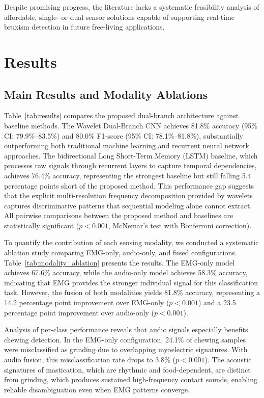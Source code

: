 \documentclass[pdflatex,sn-vancouver-num, iicol]{sn-jnl}
\begin{document}
Despite promising progress, the literature lacks a systematic feasibility analysis of affordable, single- or dual-sensor solutions capable of supporting real-time bruxism detection in future free-living applications.



\section{Results}
\subsection{Main Results and Modality Ablations}

Table~\ref{tab:results} compares the proposed dual-branch architecture against baseline methods. The Wavelet Dual-Branch CNN achieves 81.8\% accuracy (95\% CI: 79.9\%--83.5\%) and 80.0\% F1-score (95\% CI: 78.1\%--81.8\%), substantially outperforming both traditional machine learning and recurrent neural network approaches. The bidirectional Long Short-Term Memory (LSTM) baseline, which processes raw signals through recurrent layers to capture temporal dependencies, achieves 76.4\% accuracy, representing the strongest baseline but still falling 5.4 percentage points short of the proposed method. This performance gap suggests that the explicit multi-resolution frequency decomposition provided by wavelets captures discriminative patterns that sequential modeling alone cannot extract. All pairwise comparisons between the proposed method and baselines are statistically significant ($p < 0.001$, McNemar's test with Bonferroni correction).


To quantify the contribution of each sensing modality, we conducted a systematic ablation study comparing EMG-only, audio-only, and fused configurations. Table~\ref{tab:modality_ablation} presents the results. The EMG-only model achieves 67.6\% accuracy, while the audio-only model achieves 58.3\% accuracy, indicating that EMG provides the stronger individual signal for this classification task. However, the fusion of both modalities yields 81.8\% accuracy, representing a 14.2 percentage point improvement over EMG-only ($p < 0.001$) and a 23.5 percentage point improvement over audio-only ($p < 0.001$).

Analysis of per-class performance reveals that audio signals especially benefits chewing detection. In the EMG-only configuration, 24.1\% of chewing samples were misclassified as grinding due to overlapping myoelectric signatures. With audio fusion, this misclassification rate drops to 3.8\% ($p < 0.001$). The acoustic signatures of mastication, which are rhythmic and food-dependent, are distinct from grinding, which produces sustained high-frequency contact sounds, enabling reliable disambiguation even when EMG patterns converge.
\end{document}
